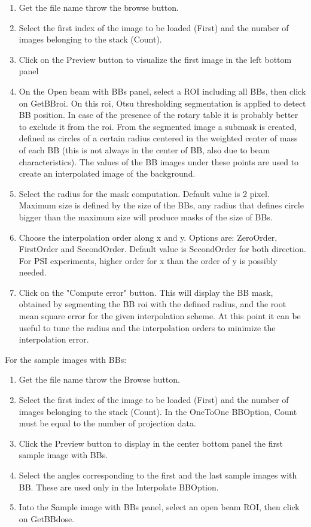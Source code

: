 \documentclass[a4paper]{scrreprt}
\begin{document}
\begin{enumerate}
\item Get the file name throw the browse button.
\item Select the first index of the image to be loaded (First) and the number of images belonging to the stack (Count).
\item Click on the Preview button to visualize the first image in the left bottom panel
\item On the Open beam with BBs panel, select a ROI including all BBs, then click on GetBBroi. On this roi, Otsu thresholding segmentation is applied to detect BB position. In case of the presence of the rotary table it is probably better to exclude it from the roi. From the segmented image a submask is created, defined as circles of a certain radius centered in the weighted center of mass of each BB (this is not always in the center of BB, also due to beam characteristics). The values of the BB images under these points are used to create an interpolated image of the background. 
\item Select the radius for the mask computation. Default value is 2 pixel. Maximum size is defined by the size of the BBs, any radius that defines circle bigger than the maximum size will produce masks of the size of BBs. 
\item Choose the interpolation order along x and y. Options are: ZeroOrder, FirstOrder and SecondOrder. Default value is SecondOrder for both direction. For PSI experiments, higher order for x than the order of y is possibly needed. 
\item Click on the "Compute error" button. This will display the BB mask, obtained by segmenting the BB roi with the defined radius, and the root mean square error for the given interpolation scheme. At this point it can be useful to tune the radius and the interpolation orders to minimize the interpolation error. 
\end{enumerate}
For the sample images with BBs:
\begin{enumerate}
\item Get the file name throw the Browse button.
\item Select the first index of the image to be loaded (First) and the number of images belonging to the stack (Count). In the OneToOne BBOption, Count must be equal to the number of projection data. 
\item Click the Preview button to display in the center bottom panel the first sample image with BBs. 
\item Select the angles corresponding to the first and the last sample images with BB. These are used only in the Interpolate BBOption. 
\item Into the Sample image with BBs panel, select an open beam ROI, then click on GetBBdose.
\end{enumerate}
\end{document}
